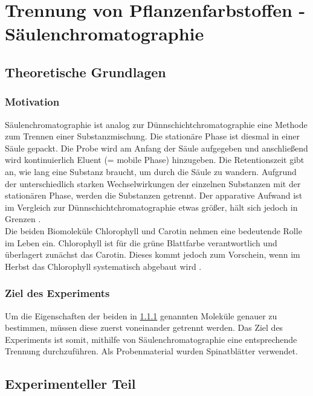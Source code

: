 \documentclass{article}
\begin{document}
  \pagebreak
  
  \section{Trennung von Pflanzenfarbstoffen - Säulenchromatographie}
  
    \subsection{Theoretische Grundlagen}
    
      \subsubsection{Motivation} \label{sec:Motivationzwei}
      
        Säulenchromatographie ist analog zur Dünnschichtchromatographie eine Methode zum Trennen einer Substanzmischung. Die stationäre Phase ist diesmal in einer Säule gepackt. Die Probe wird am Anfang der Säule aufgegeben und anschließend wird kontinuierlich Eluent (= mobile Phase) hinzugeben. Die Retentionszeit gibt an, wie lang eine Substanz braucht, um durch die Säule zu wandern. Aufgrund der unterschiedlich starken Wechselwirkungen der einzelnen Substanzen mit der stationären Phase, werden die Substanzen getrennt. Der apparative Aufwand ist im Vergleich zur Dünnschichtchromatographie etwas größer, hält sich jedoch in Grenzen \cite[S. 154]{TaschenatlasAnallytik}.\\
        
        Die beiden Biomoleküle Chlorophyll und Carotin nehmen eine bedeutende Rolle im Leben ein. Chlorophyll ist für die grüne Blattfarbe verantwortlich und überlagert zunächst das Carotin. Dieses kommt jedoch zum Vorschein, wenn im Herbst das Chlorophyll systematisch abgebaut wird \cite{DegradationChlorophyll}. 
      
      \subsubsection{Ziel des Experiments}
      
        Um die Eigenschaften der beiden in \ref{sec:Motivationzwei} genannten Moleküle genauer zu bestimmen, müssen diese zuerst voneinander getrennt werden. Das Ziel des Experiments ist somit, mithilfe von Säulenchromatographie eine entsprechende Trennung durchzuführen. Als Probenmaterial wurden Spinatblätter verwendet.
    
    \subsection{Experimenteller Teil}
    
\end{document}
